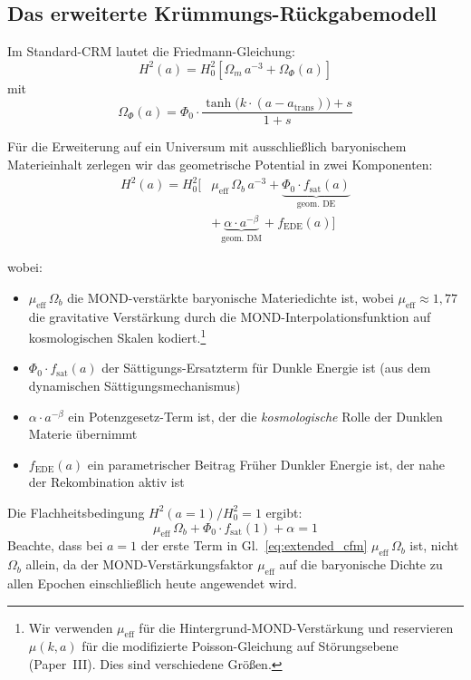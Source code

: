 \documentclass[aps,prd,twocolumn,superscriptaddress,nofootinbib,floatfix]{revtex4-2}
\begin{document}
\subsection{Das erweiterte Krümmungs-Rückgabemodell}

Im Standard-CRM \cite{Geiger2026} lautet die Friedmann-Gleichung:
\begin{equation}
H^2(a) = H_0^2 \left[\Omega_m\,a^{-3} + \Omega_\Phi(a)\right]
\end{equation}
mit
\begin{equation}
\Omega_\Phi(a) = \Phi_0 \cdot \frac{\tanh\!\big(k\cdot(a - a_{\mathrm{trans}})\big) + s}{1 + s}
\end{equation}

Für die Erweiterung auf ein Universum mit ausschließlich baryonischem Materieinhalt zerlegen wir das geometrische Potential in zwei Komponenten:
\begin{equation}
\begin{split}
H^2(a) = H_0^2 \Big[&\mu_{\mathrm{eff}}\,\Omega_b\,a^{-3} + \underbrace{\Phi_0 \cdot f_{\mathrm{sat}}(a)}_{\text{geom.\ DE}} \\
&+ \underbrace{\alpha \cdot a^{-\beta}}_{\text{geom.\ DM}} + f_{\mathrm{EDE}}(a)\Big]
\end{split}
\label{eq:extended_cfm}
\end{equation}

wobei:
\begin{itemize}
\item $\mu_{\mathrm{eff}}\,\Omega_b$ die MOND-verstärkte baryonische Materiedichte ist, wobei $\mu_{\mathrm{eff}} \approx 1{,}77$ die gravitative Verstärkung durch die MOND-Interpolationsfunktion auf kosmologischen Skalen kodiert.\footnote{Wir verwenden $\mu_{\mathrm{eff}}$ für die Hintergrund-MOND-Verstärkung und reservieren $\mu(k,a)$ für die modifizierte Poisson-Gleichung auf Störungsebene (Paper~III). Dies sind verschiedene Größen.}
\item $\Phi_0 \cdot f_{\mathrm{sat}}(a)$ der Sättigungs-Ersatzterm für Dunkle Energie ist (aus dem dynamischen Sättigungsmechanismus)
\item $\alpha \cdot a^{-\beta}$ ein Potenzgesetz-Term ist, der die \textit{kosmologische} Rolle der Dunklen Materie übernimmt
\item $f_{\mathrm{EDE}}(a)$ ein parametrischer Beitrag Früher Dunkler Energie ist, der nahe der Rekombination aktiv ist
\end{itemize}

Die Flachheitsbedingung $H^2(a{=}1)/H_0^2 = 1$ ergibt:
\begin{equation}
\mu_{\mathrm{eff}}\,\Omega_b + \Phi_0 \cdot f_{\mathrm{sat}}(1) + \alpha = 1
\end{equation}
Beachte, dass bei $a=1$ der erste Term in Gl.~\eqref{eq:extended_cfm} $\mu_{\mathrm{eff}}\,\Omega_b$ ist, nicht $\Omega_b$ allein, da der MOND-Verstärkungsfaktor $\mu_{\mathrm{eff}}$ auf die baryonische Dichte zu allen Epochen einschließlich heute angewendet wird.
\end{document}
